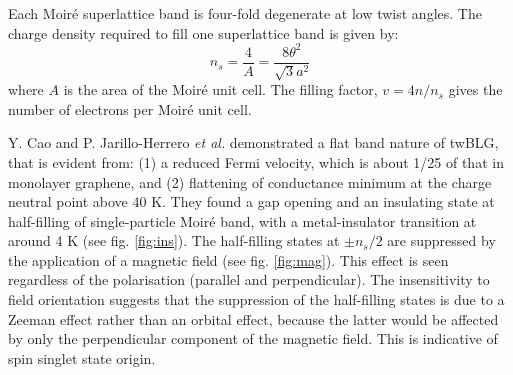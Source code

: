 Each Moiré superlattice band is four-fold degenerate at low twist angles. \cite{Cao2018} The charge density required to fill one superlattice band is given by:
\begin{equation}
	n_s=\frac{4}{A}=\frac{8\theta^2}{\sqrt{3}a^2}
\end{equation}
where $A$ is the area of the Moiré unit cell. The filling factor, $v=4n/n_s$ gives the number of electrons per Moiré unit cell.

Y. Cao and P. Jarillo-Herrero \textit{et al.} demonstrated a flat band nature of twBLG, that is evident from: (1) a reduced Fermi velocity, which is about 1/25 of that
in monolayer graphene, and (2) flattening of conductance minimum at the charge neutral point above 40 K. \cite{Cao2018}
They found a gap opening and an insulating state at half-filling of single-particle Moiré band, with a metal-insulator transition at
around 4 K (see fig. \ref{fig:ins}). The half-filling states at $\pm n_s/2$ are suppressed by the application of a magnetic field (see fig. \ref{fig:mag}). This effect is seen regardless of the polarisation (parallel and perpendicular). The insensitivity to field orientation suggests that the suppression of the half-filling states is due to a Zeeman effect rather than an orbital effect, because the latter would be affected by only the perpendicular component of the magnetic field. This is indicative of spin singlet state origin.

